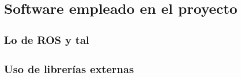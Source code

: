 \section{Software empleado en el proyecto}
\subsection{Lo de ROS y tal}
\subsection{Uso de librerías externas}
